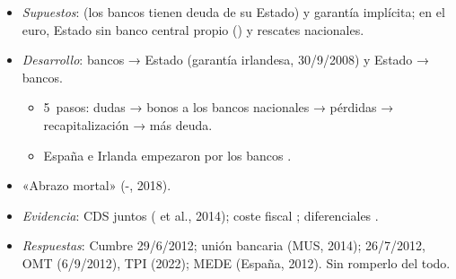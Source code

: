 \documentclass{article}
\begin{document}
\begin{columnas}
\begin{itemize}
\end{itemize}
\begin{itemize}
\item \emph{Supuestos}:  (los bancos tienen deuda de su Estado) y garantía implícita; en el euro, Estado sin banco central propio () y rescates nacionales.
\item \emph{Desarrollo}: bancos → Estado (garantía irlandesa, 30/9/2008) y Estado → bancos.
  \begin{itemize}
  \item 5~pasos: dudas → bonos a los bancos nacionales → pérdidas → recapitalización → más deuda.
  \item España e Irlanda empezaron por los bancos .
  \end{itemize}
\end{itemize}
\begin{itemize}
\item «Abrazo mortal» (-, 2018).
\item \emph{Evidencia}: CDS juntos ( et al., 2014); coste fiscal ; diferenciales .
\item \emph{Respuestas}: Cumbre 29/6/2012; unión bancaria (MUS, 2014);  26/7/2012, OMT (6/9/2012), TPI (2022); MEDE (España, 2012). Sin romperlo del todo.
\end{itemize}


\end{columnas}
\end{document}
